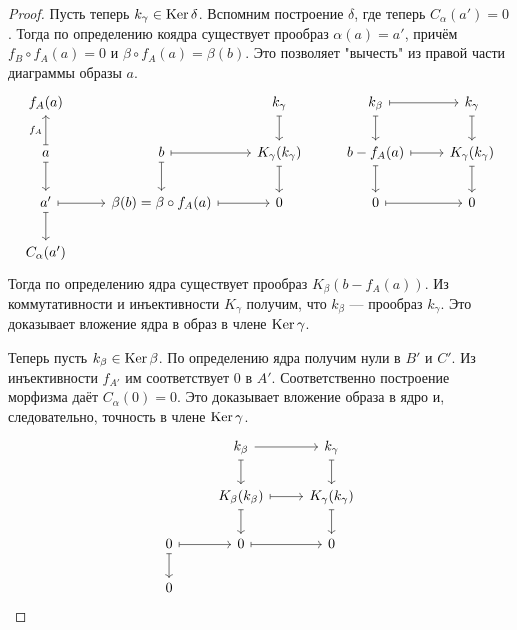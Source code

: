 \documentclass[../main.tex]{subfiles}
\begin{document}
\begin{proof}
    Пусть теперь $k_\gamma \in \mathop{\mathrm{Ker}}\nolimits\delta$. Вспомним построение $\delta$, где теперь $C_\alpha(a')=0$. Тогда по определению коядра существует прообраз $\alpha(a) = a'$, причём $f_B\circ f_A (a) = 0$ и $\beta\circ f_A(a) = \beta(b)$. Это позволяет "вычесть" из правой части диаграммы образы $a$.
    \begin{equation*}
        \begin{tikzcd}
	{f_A(a)} && {k_\gamma} & {k_\beta} & {k_\gamma} \\
	a & b & {K_\gamma(k_\gamma)} & {b-f_A(a)} & {K_\gamma(k_\gamma)} \\
	{a'} & {\beta(b) = \beta\circ f_A(a)} & 0 & 0 & 0 \\
	{C_\alpha(a')}
	\arrow[maps to, from=1-3, to=2-3]
	\arrow[maps to, from=2-1, to=3-1]
	\arrow["{f_A}", maps to, from=2-1, to=1-1]
	\arrow[maps to, from=3-1, to=3-2]
	\arrow[maps to, from=2-2, to=3-2]
	\arrow[maps to, from=2-3, to=3-3]
	\arrow[maps to, from=2-2, to=2-3]
	\arrow[maps to, from=3-2, to=3-3]
	\arrow[maps to, from=3-1, to=4-1]
	\arrow[maps to, from=1-4, to=2-4]
	\arrow[maps to, from=1-4, to=1-5]
	\arrow[maps to, from=2-4, to=3-4]
	\arrow[maps to, from=1-5, to=2-5]
	\arrow[maps to, from=2-5, to=3-5]
	\arrow[maps to, from=2-4, to=2-5]
	\arrow[maps to, from=3-4, to=3-5]
\end{tikzcd}
    \end{equation*}
    Тогда по определению ядра существует прообраз $K_\beta (b-f_A(a))$. Из коммутативности и инъективности $K_\gamma$ получим, что $k_\beta$ --- прообраз $k_\gamma$. Это доказывает вложение ядра в образ в члене $\mathop{\mathrm{Ker}}\nolimits\gamma$.

    Теперь пусть $k_\beta\in \mathop{\mathrm{Ker}}\nolimits\beta$. По определению ядра получим нули в $B'$ и $C'$. Из инъективности $f_{A'}$ им соответствует 0 в $A'$. Соответственно построение морфизма даёт $C_\alpha (0) = 0$. Это доказывает вложение образа в ядро и, следовательно, точность в члене $\mathop{\mathrm{Ker}}\nolimits\gamma$.
    \begin{equation*}
        \begin{tikzcd}
	& {k_\beta} & {k_\gamma} \\
	& {K_\beta(k_\beta)} & {K_\gamma(k_\gamma)} \\
	0 & 0 & 0 \\
	0
	\arrow[maps to, from=1-2, to=2-2]
	\arrow[from=1-2, to=1-3]
	\arrow[maps to, from=1-3, to=2-3]
	\arrow[maps to, from=2-3, to=3-3]
	\arrow[maps to, from=2-2, to=2-3]
	\arrow[maps to, from=2-2, to=3-2]
	\arrow[maps to, from=3-2, to=3-3]
	\arrow[maps to, from=3-1, to=3-2]
	\arrow[maps to, from=3-1, to=4-1]
\end{tikzcd}
    \end{equation*}
\end{proof}
\end{document}
